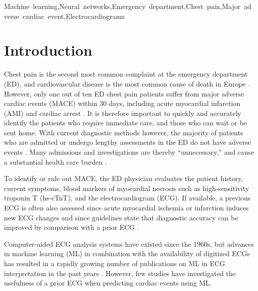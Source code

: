 \documentclass[preprint]{elsarticle}
\begin{document}
\begin{frontmatter}
\begin{keyword}
Machine~learning\sep Neural~networks\sep Emergency~department\sep Chest~pain\sep Major~adverse~cardiac~event\sep Electrocardiograms
\end{keyword}

\end{frontmatter}



\section{Introduction}
\label{sec:introduction}
Chest pain is the second most common complaint at the emergency department (ED), and cardiovascular disease is the most common cause of death in Europe \citep{timmis2022}. However, only one out of ten ED chest pain patients suffer from major adverse cardiac events (MACE) within 30 days, including acute myocardial infarction (AMI) and cardiac arrest \citep{mokhtari2016}. It is therefore important to quickly and accurately identify the patients who require immediate care, and those who can wait or be sent home. With current diagnostic methods however, the majority of patients who are admitted or undergo lengthy assessments in the ED do not have adverse events \citep{christenson2004,pollack2006}. Many admissions and investigations are thereby ``unnecessary,'' and cause a substantial health care burden \citep{cullen2015}.

To identify or rule out MACE, the ED physician evaluates the patient history, current symptoms, blood markers of myocardial necrosis such as high-sensitivity troponin T (hs-cTnT), and the electrocardiogram (ECG). If available, a previous ECG is often also assessed since acute myocardial ischemia or infarction induces new ECG changes and since guidelines state that diagnostic accuracy can be improved by comparison with a prior ECG \citep{anderson2013,lee1990}.

Computer-aided ECG analysis systems have existed since the 1960s, but advances in machine learning (ML) in combination with the availability of digitized ECGs has resulted in a rapidly growing number of publications on ML in ECG interpretation in the past years \citep{pipberger1961,ansari2017,liu2021}. However, few studies have investigated the usefulness of a prior ECG when predicting cardiac events using ML. 
\end{document}
